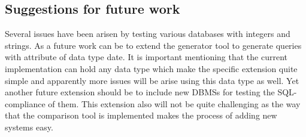 \subsection{Suggestions for future work}
Several issues have been arisen by testing various databases with integers and strings. As a future work can be to extend the generator tool to generate queries with attribute of data type date. It is important mentioning that the current implementation can hold any data type which make the specific extension quite simple and apparently more issues will be arise using this data type as well. Yet another future extension should be to include new DBMSs for testing the SQL-compliance of them. This extension also will not be quite challenging as the way that the comparison tool is implemented makes the process of adding new systems easy. 
